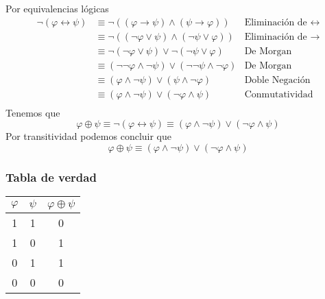 \documentclass[a4paper]{article}
\begin{document}
Por equivalencias lógicas
\begin{align*}
    \neg \left(\varphi \leftrightarrow \psi\right) &\equiv \neg \left(\left(\varphi \rightarrow \psi\right) \land \left( \psi \rightarrow \varphi  \right)\right) &\text{Eliminación de \(\leftrightarrow\)} \\
                                                   &\equiv  \neg \left(\left(\neg \varphi \lor \psi\right) \land \left( \neg \psi \lor \varphi  \right)\right) &\text{Eliminación de \(\rightarrow\)} \\
                                                   &\equiv  \neg \left(\neg \varphi \lor \psi\right) \lor \neg \left( \neg \psi \lor \varphi  \right) &\text{De Morgan} \\
                                                   &\equiv   \left(\neg\neg \varphi \land \neg \psi\right) \lor \left( \neg \neg \psi \land \neg \varphi  \right) &\text{De Morgan} \\
                                                   &\equiv   \left(\varphi \land \neg \psi\right) \lor \left( \psi \land \neg \varphi  \right) &\text{Doble Negación} \\
                                                   &\equiv   \left(\varphi \land \neg \psi\right) \lor \left( \neg \varphi \land \psi  \right) &\text{Conmutatividad} \\
\end{align*}
Tenemos que
\[
    \varphi \oplus \psi \equiv \neg \left(\varphi \leftrightarrow \psi\right) \equiv   \left(\varphi \land \neg \psi\right) \lor \left( \neg \varphi \land \psi  \right)
\]
Por transitividad podemos concluir que
\[
    \varphi \oplus \psi \equiv \left(\varphi \land \neg \psi\right) \lor \left( \neg \varphi \land \psi  \right)
\]
\subsubsection{Tabla de verdad}
\begin{center}
    \begin{tabular}{ccc}
    $\varphi$ & \(\psi\) & $\varphi \oplus \psi$\\
    \midrule
    1 & 1 & 0 \\
    1 & 0 & 1 \\
    0 & 1 & 1 \\
    0 & 0 & 0 \\
    \end{tabular}
\end{center}
\end{document}
